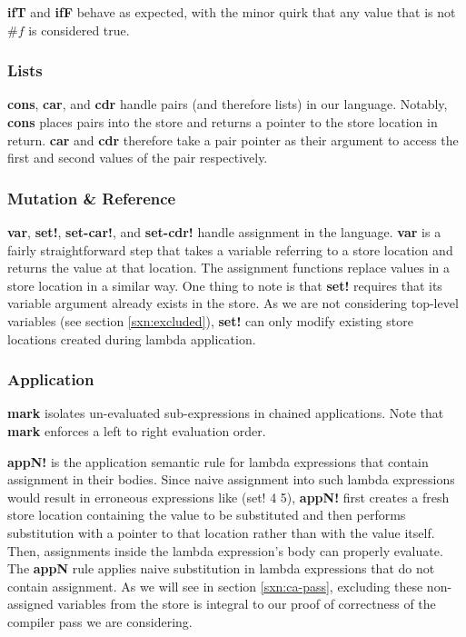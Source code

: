 \textbf{ifT} and \textbf{ifF} behave as expected, with the minor quirk that any value that is not $\#f$ is considered true.

\subsubsection{Lists}\label{sxn:sem_lists}
\textbf{cons}, \textbf{car}, and \textbf{cdr} handle pairs (and therefore lists) in our language. Notably, \textbf{cons} places pairs into the store and returns a pointer to the store location in return. \textbf{car} and \textbf{cdr} therefore take a pair pointer as their argument to access the first and second values of the pair respectively.

\subsubsection{Mutation \& Reference}\label{sxn:sem_assign}
\textbf{var}, \textbf{set!}, \textbf{set-car!}, and \textbf{set-cdr!} handle assignment in the language. \textbf{var} is a fairly straightforward step that takes a variable referring to a store location and returns the value at that location. The assignment functions replace values in a store location in a similar way. One thing to note is that \textbf{set!} requires that its variable argument already exists in the store. As we are not considering top-level variables (see section \ref{sxn:excluded}), \textbf{set!} can only modify existing store locations created during lambda application.

\subsubsection{Application}\label{sxn:sem_app}
\textbf{mark} isolates un-evaluated sub-expressions in chained applications. Note that \textbf{mark} enforces a left to right evaluation order.

\textbf{appN!} is the application semantic rule for lambda expressions that contain assignment in their bodies. Since naive assignment into such lambda expressions would result in erroneous expressions like (set! 4 5), \textbf{appN!} first creates a fresh store location containing the value to be substituted and then performs substitution with a pointer to that location rather than with the value itself. Then, assignments inside the lambda expression's body can properly evaluate. The \textbf{appN} rule applies naive substitution in lambda expressions that do not contain assignment. As we will see in section \ref{sxn:ca-pass}, excluding these non-assigned variables from the store is integral to our proof of correctness of the compiler pass we are considering.

